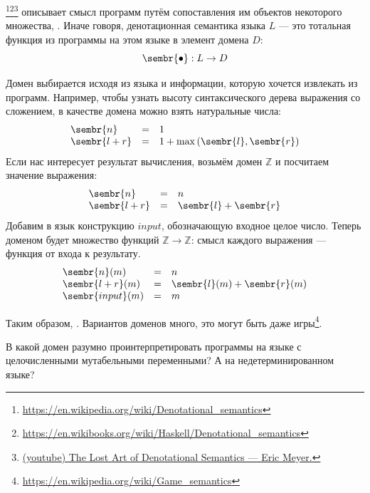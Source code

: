 \footnote{\url{https://en.wikipedia.org/wiki/Denotational_semantics}}\footnote{\url{https://en.wikibooks.org/wiki/Haskell/Denotational_semantics}}\footnote{\href{https://youtu.be/pQyH0p-XJzE?si=TUEzrpHhJZfO7dTF}{(youtube) The Lost Art of Denotational Semantics --- Eric Meyer.}\label{foot:the-lost-art-of-denotations}} описывает смысл программ путём сопоставления им объектов некоторого множества, .
Иначе говоря, денотационная семантика языка $L$ --- это тотальная функция из программы на этом языке в элемент домена $D$:
\[
    \sembr{\bullet} : L \to D
\]

Домен выбирается исходя из языка и информации, которую хочется извлекать из программ.
Например, чтобы узнать высоту синтаксического дерева выражения со сложением, в качестве домена можно взять натуральные числа:
\[
    \begin{array}{lcl}
        \sembr{n}     & = & 1                                \\
        \sembr{l + r} & = & 1 + \max{(\sembr{l}, \sembr{r})}
    \end{array}
\]
Если нас интересует результат вычисления, возьмём домен $\mathbb{Z}$ и посчитаем значение выражения:
\[
    \begin{array}{lcl}
        \sembr{n}     & = & n                     \\
        \sembr{l + r} & = & \sembr{l} + \sembr{r}
    \end{array}
\]
Добавим в язык конструкцию $input$, обозначающую входное целое число.
Теперь доменом будет множество функций $\mathbb{Z}\to\mathbb{Z}$: смысл каждого выражения --- функция от входа к результату.
\[
    \begin{array}{lcl}
        \sembr{n}(m)     & = & n                           \\
        \sembr{l + r}(m) & = & \sembr{l}(m) + \sembr{r}(m) \\
        \sembr{input}(m) & = & m
    \end{array}
\]

Таким образом, .
Вариантов доменов много, это могут быть даже игры\footnote{\url{https://en.wikipedia.org/wiki/Game_semantics}}. %

\begin{task}
    В какой домен разумно проинтерпретировать программы на языке с целочисленными мутабельными переменными?
    А на недетерминированном языке?
\end{task}

